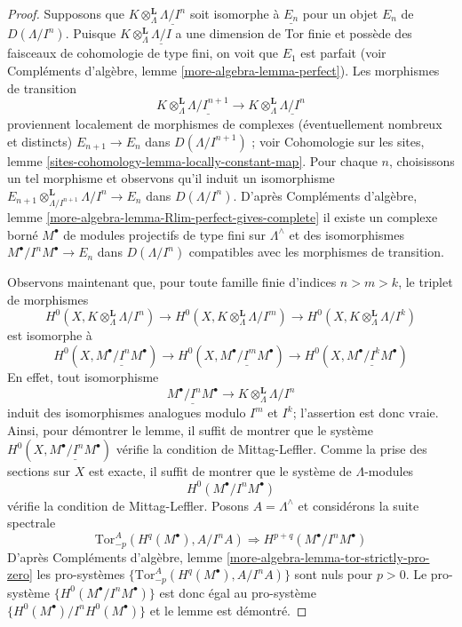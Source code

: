 \begin{proof}
Supposons que $K \otimes_\Lambda^\mathbf{L} \underline{\Lambda/I^n}$ soit isomorphe
à $\underline{E_n}$ pour un objet $E_n$ de $D(\Lambda/I^n)$.
Puisque $K \otimes_\Lambda^\mathbf{L} \underline{\Lambda/I}$ a une
dimension de Tor finie et possède des faisceaux de cohomologie de type fini,
on voit que $E_1$ est parfait (voir
Compléments d'algèbre, lemme \ref{more-algebra-lemma-perfect}). Les morphismes de transition
$$
K \otimes_\Lambda^\mathbf{L} \underline{\Lambda/I^{n + 1}}
\to
K \otimes_\Lambda^\mathbf{L} \underline{\Lambda/I^n}
$$
proviennent localement de morphismes de complexes (éventuellement nombreux et distincts)
$E_{n + 1} \to E_n$ dans $D(\Lambda/I^{n + 1})$ ; voir
Cohomologie sur les sites, lemme \ref{sites-cohomology-lemma-locally-constant-map}.
Pour chaque $n$, choisissons un tel morphisme et observons qu'il induit
un isomorphisme
$E_{n + 1} \otimes_{\Lambda/I^{n + 1}}^\mathbf{L} \Lambda/I^n \to E_n$
dans $D(\Lambda/I^n)$. D'après
Compléments d'algèbre, lemme \ref{more-algebra-lemma-Rlim-perfect-gives-complete}
il existe un complexe borné $M^\bullet$ de modules projectifs de type fini sur
$\Lambda^\wedge$ et des isomorphismes $M^\bullet/I^nM^\bullet \to E_n$
dans $D(\Lambda/I^n)$ compatibles avec les morphismes de transition.

\medskip\noindent
Observons maintenant que, pour toute famille finie d'indices
$n > m > k$, le triplet de morphismes
$$
H^0(X, K \otimes_\Lambda^\mathbf{L} \Lambda/I^n)
\to
H^0(X, K \otimes_\Lambda^\mathbf{L} \Lambda/I^m)
\to
H^0(X, K \otimes_\Lambda^\mathbf{L} \Lambda/I^k)
$$
est isomorphe à
$$
H^0(X, \underline{M^\bullet/I^nM^\bullet})
\to
H^0(X, \underline{M^\bullet/I^mM^\bullet})
\to
H^0(X, \underline{M^\bullet/I^kM^\bullet})
$$
En effet, tout isomorphisme
$$
\underline{M^\bullet/I^nM^\bullet} \to
K \otimes_\Lambda^\mathbf{L} \Lambda/I^n
$$
induit des isomorphismes analogues modulo $I^m$ et $I^k$; l'assertion est donc
vraie. Ainsi, pour démontrer le lemme, il suffit de montrer que
le système
$H^0(X, \underline{M^\bullet/I^nM^\bullet})$ vérifie la condition de Mittag-Leffler.
Comme la prise des sections sur $X$ est exacte, il suffit de montrer que
le système de $\Lambda$-modules
$$
H^0(M^\bullet/I^nM^\bullet)
$$
vérifie la condition de Mittag-Leffler. Posons $A = \Lambda^\wedge$ et considérons la suite
spectrale
$$
\text{Tor}_{-p}^A(H^q(M^\bullet), A/I^nA) \Rightarrow
H^{p + q}(M^\bullet/I^nM^\bullet)
$$
D'après Compléments d'algèbre, lemme \ref{more-algebra-lemma-tor-strictly-pro-zero}
les pro-systèmes $\{\text{Tor}_{-p}^A(H^q(M^\bullet), A/I^nA)\}$ sont nuls
pour $p > 0$. Le pro-système $\{H^0(M^\bullet/I^nM^\bullet)\}$
est donc égal au pro-système $\{H^0(M^\bullet)/I^nH^0(M^\bullet)\}$
et le lemme est démontré.
\end{proof}

